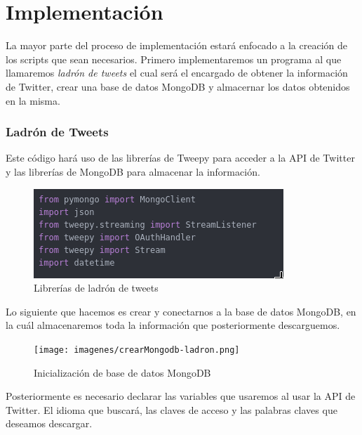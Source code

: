 
\chapter{Implementación}

La mayor parte del proceso de implementación estará enfocado a la creación de los scripts que sean necesarios. Primero implementaremos un programa al que llamaremos \textit{ladrón de tweets} el cual será el encargado de obtener la información de Twitter, crear una base de datos MongoDB y almacernar los datos obtenidos en la misma. 


\subsection{Ladrón de Tweets}

Este código hará uso de las librerías de Tweepy para acceder a la API de Twitter y las librerías de MongoDB para almacenar la información.

\begin{figure}[h]
	\centering
	\includegraphics[scale=.6]{imagenes/include-ladron.png}
	\caption{Librerías de ladrón de tweets}
	\label{fig:include-ladron}
\end{figure}


Lo siguiente que hacemos es crear y conectarnos a la base de datos MongoDB, en la cuál almacenaremos toda la información que posteriormente descarguemos. 

\begin{figure}[h]
	\centering
	\texttt{[image: imagenes/crearMongodb-ladron.png]}
	\caption{Inicialización de base de datos MongoDB}
	\label{fig:crear-mongodb}
\end{figure}


Posteriormente es necesario declarar las variables que usaremos al usar la API de Twitter. El idioma que buscará, las claves de acceso y las palabras claves que deseamos descargar. 

